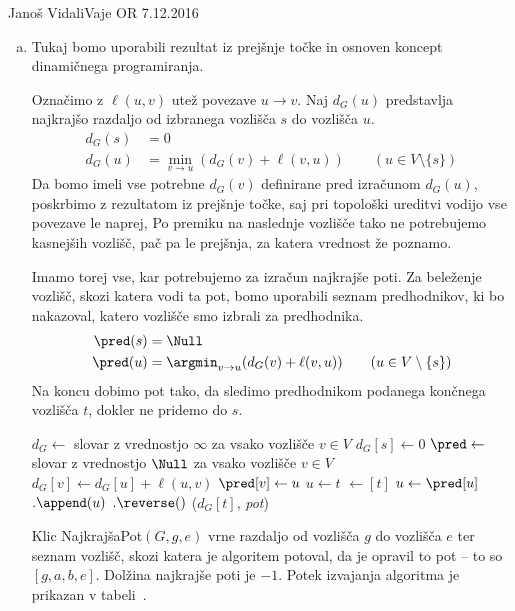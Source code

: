 \begin{naloga}{Janoš Vidali}{Vaje OR 7.12.2016}
\begin{odgovor}
\begin{enumerate}[(a)]
Klic {\sc Topo}$(G)$ nam vrne ureditev vozlišč $[g, a, h, b, c, f, d, e]$.

\item Tukaj bomo uporabili rezultat iz prejšnje točke
in osnoven koncept dinamičnega programiranja.

Označimo z $\ell(u, v)$ utež povezave $u \rightarrow v$.
Naj $d_G(u)$ predstavlja najkrajšo razdaljo
od izbranega vozlišča $s$ do vozlišča $u$.
\begin{align*}
d_G(s) &= 0 \\
d_G(u) &= \min_{v \rightarrow u}(d_G(v) + \ell(v, u))
\qquad (u \in V \setminus \{s\})
\end{align*}
Da bomo imeli vse potrebne $d_G(v)$ definirane pred izračunom $d_G(u)$,
poskrbimo z rezultatom iz prejšnje točke,
saj pri topološki ureditvi vodijo vse povezave le naprej,
Po premiku na naslednje vozlišče tako ne potrebujemo kasnejših vozlišč,
pač pa le prejšnja, za katera vrednost že poznamo.

Imamo torej vse, kar potrebujemo za izračun najkrajše poti.
Za beleženje vozlišč, skozi katera vodi ta pot,
bomo uporabili seznam predhodnikov,
ki bo nakazoval, katero vozlišče smo izbrali za predhodnika.
\begin{align*}
\pred(s) &= \Null \\
\pred(u) &= \argmin_{v \rightarrow u}(d_G(v) + \ell(v, u))
\qquad (u \in V \setminus \{s\})
\end{align*}
Na koncu dobimo pot tako,
da sledimo predhodnikom podanega končnega vozlišča $t$,
dokler ne pridemo do $s$.

\begin{small}
\begin{algorithmic}
	\State $d_G \gets$ slovar z vrednostjo $\infty$ za vsako vozlišče $v \in V$
	\State $d_G[s] \gets 0$
	\State $\pred \gets$ slovar z vrednostjo $\Null$ za vsako vozlišče $v \in V$
				\State $d_G[v] \gets d_G[u] + \ell(u, v)$
				\State $\pred[v] \gets u$
			\EndIf
		\EndFor
	\EndFor
    \State $u \gets t$
	 $\gets [t]$
	\While{$\pred[u] \ne \Null$}
        \State $u \gets \pred[u]$
		$.\append(u)$
	\EndWhile
    $.\reverse()$
	\State \Return ($d_G[t]$, {\sl pot})
\EndFunction 
\end{algorithmic}
\end{small}

Klic {\sc NajkrajšaPot}$(G, g, e)$
vrne razdaljo od vozlišča $g$ do vozlišča $e$
ter seznam vozlišč, skozi katera je algoritem potoval,
da je opravil to pot -- to so $[g, a, b, e]$.
Dolžina najkrajše poti je $-1$.
Potek izvajanja algoritma je prikazan v tabeli~.


\end{enumerate}
\end{odgovor}
\end{naloga}
